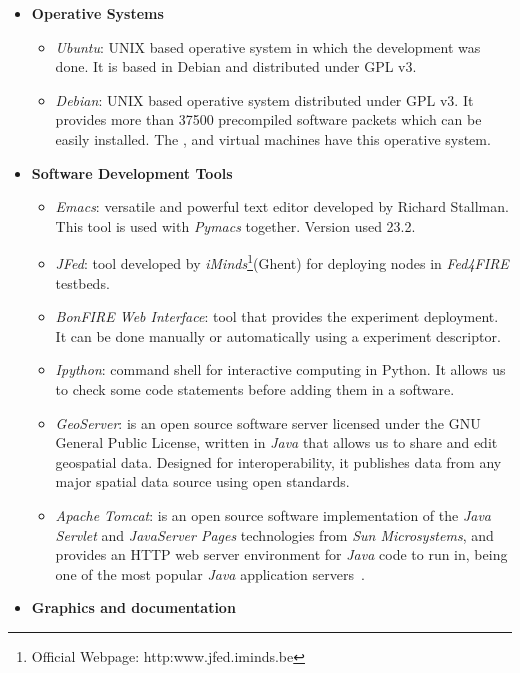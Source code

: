 \begin{itemize}
\item \textbf{Operative Systems}
\begin{itemize}
\item{\emph{Ubuntu}}: UNIX based operative system in which the development was done. It
  is based in Debian and distributed under \ac{GPL} v3.
\item{\emph{Debian}}: UNIX based operative system distributed under \ac{GPL}
  v3. It provides more than 37500 precompiled software packets which can be
  easily installed. The \bonfire, \vw and \pl virtual machines have this operative system.
\end{itemize}


\item \textbf{Software Development Tools}

\begin{itemize}
\item{\emph{Emacs}}: versatile and powerful text editor developed by Richard
  Stallman. This tool is used with \emph{Pymacs} together. Version used 23.2.
\item{\emph{JFed}}: tool developed by \emph{iMinds}\footnote{Official Webpage: http:www.jfed.iminds.be}(Ghent) for deploying nodes in
  \emph{Fed4FIRE} testbeds. 
\item{\emph{BonFIRE Web Interface}}: \bonfire tool that provides the experiment
  deployment. It can be done manually or automatically using a experiment descriptor.
\item \emph{Ipython}:  command shell for interactive computing in Python. It
  allows us to check some code statements before adding them in a software.
\item \emph{GeoServer}: is an open source software server licensed under the
  \ac{GNU} General Public License, written in \emph{Java} that allows us to
  share and edit geospatial data. Designed for interoperability, it publishes
  data from any major spatial data source using open standards.
\item \emph{Apache Tomcat}:  is an open source software implementation of the \emph{Java Servlet} and \emph{JavaServer Pages} technologies from \emph{Sun Microsystems}, and provides an \ac{HTTP} web server environment for \emph{Java} code to run in, being one of the most popular \emph{Java} application servers~\cite{Foundation2014b}.
\end{itemize}


\item \textbf{Graphics and documentation}


\end{itemize}
